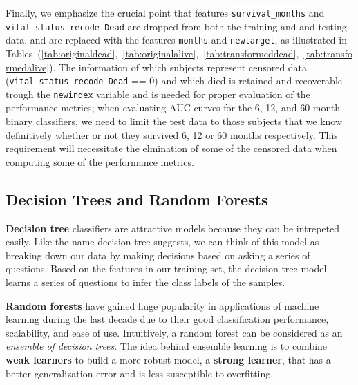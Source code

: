\documentclass[a4paper,11pt]{article}
\newcommand{\codewhite}[1]{\colorbox{white}{\texttt{#1}}}
\begin{document}
Finally, we emphasize the crucial point that features \codewhite{survival\_months} and \\
\codewhite{vital\_status\_recode\_Dead} are dropped from both the training and and testing data, and are replaced with the features \codewhite{months} and \codewhite{newtarget}, as illustrated in Tables~(\ref{tab:originaldead},~\ref{tab:originalalive},~\ref{tab:transformeddead},~\ref{tab:transformedalive}). The information of which subjects represent censored data (\codewhite{vital\_status\_recode\_Dead} == 0) and which died is retained and recoverable trough the \codewhite{newindex} variable and is needed for proper evaluation of the performance metrics; when evaluating AUC curves for the 6, 12, and 60 month binary classifiers, we need to limit the test data to those subjects that we know definitively whether or not they survived 6, 12 or 60 months respectively. This requirement will necessitate the elmination of some of the censored data when computing some of the performance metrics.






\subsection{Decision Trees and Random Forests}

\textbf{Decision tree} classifiers are attractive models because they can be intrepeted easily. Like the name decision tree suggests, we can think of this model as breaking down our data by making decisions based on asking a series of questions.
Based on the features in our training set, the decision tree model learns a series of questions to infer the class labels of the samples. 

\textbf{Random forests} have gained huge popularity in applications of machine learning during the last decade due to their good classification performance, scalability, and ease of use. Intuitively, a random forest can be considered as an \textit{ensemble of decision trees}. The idea behind ensemble learning is to combine \textbf{weak learners} to build a more robust model, a \textbf{strong learner}, that has a better generalization error and is less susceptible to overfitting. 
\end{document}
